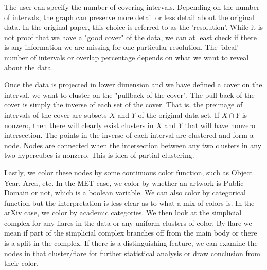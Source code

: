 \documentclass[12pt]{article}
\theoremstyle{definition}
\begin{document}
\newline
\par The user can specify the number of covering intervals. Depending on the number of intervals, the graph can preserve more detail or less detail about the original data. In the original paper, this choice is referred to as the 'resolution'. While it is not proof that we have a "good cover" of the data, we can at least check if there is any information we are missing for one particular resolution. The 'ideal' number of intervals or overlap percentage depends on what we want to reveal about the data. 
\newline
\par Once the data is projected in lower dimension and we have defined a cover on the interval, we want to cluster on the "pullback of the cover". The pull back of the cover is simply the inverse of each set of the cover. That is, the preimage of intervals of the cover are subsets $X$ and $Y$ of the original data set. If $X \cap Y$ is nonzero, then there will clearly exist clusters in $X$ and $Y$ that will have nonzero intersection. The points in the inverse of each interval are clustered and form a node. Nodes are connected when the intersection between any two clusters in any two hypercubes is nonzero. This is idea of partial clustering.  \cite{originalmapper}
\newline
\par Lastly, we color these nodes by some continuous color function, such as Object Year, Area, etc. In the MET case, we color by whether an artwork is Public Domain or not, which is a boolean variable. We can also color by categorical function but the interpretation is less clear as to what a mix of colors is. In the arXiv case, we color by academic categories. We then look at the simplicial complex for any flares in the data or any uniform clusters of color. By flare we mean if part of the simplicial complex branches off from the main body or there is a split in the complex. If there is a distinguishing feature, we can examine the nodes in that cluster/flare for further statistical analysis or draw conclusion from their color. 
\end{document}
